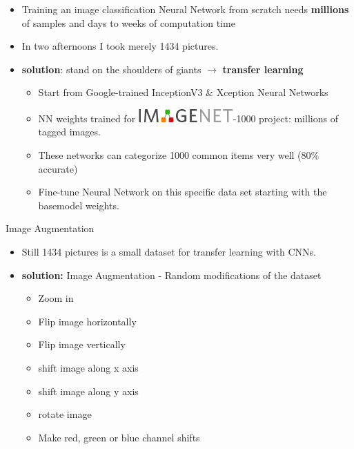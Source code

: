 \documentclass{beamer}
\begin{document}
\begin{frame}
\begin{itemize}
 \item Training an image classification Neural Network from scratch needs \textbf{millions} of samples and days to weeks of computation time 
 \item In two afternoons I took merely 1434 pictures.
 \item \textbf{solution}: stand on the shoulders of giants $\rightarrow$ \textbf{transfer learning}
  \begin{itemize}
    \item Start from Google-trained InceptionV3 \& Xception Neural Networks
    \item NN weights trained for \includegraphics[width=0.3\textwidth]{imagenet.jpg}-1000 project: millions of tagged images.
    \item These networks can categorize 1000 common items very well (80\% accurate)
    \item Fine-tune Neural Network on this specific data set starting with the basemodel weights.
  \end{itemize}
\end{itemize}
\end{frame}

\begin{frame}{Image Augmentation}
\begin{itemize}
  \item Still 1434 pictures is a small dataset for transfer learning with CNNs. 
  \item \textbf{solution:} Image Augmentation - Random modifications of the dataset
  \begin{itemize}
	\item Zoom in
	\item Flip image horizontally 
	\item Flip image vertically 
	\item shift image along x axis
	\item shift image along y axis
	\item rotate image 
	\item Make red, green or blue channel shifts
  \end{itemize}
\end{itemize}
\end{frame}
\end{document}
